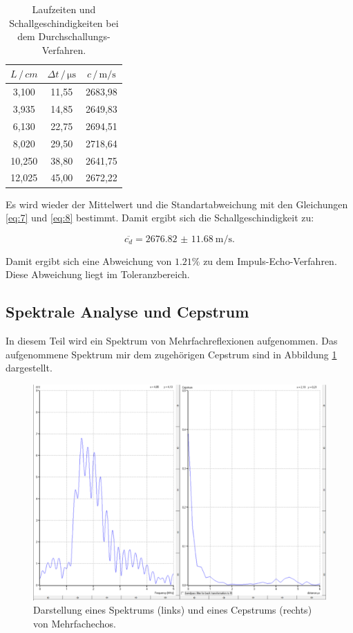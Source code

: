 \begin{table}[H]
  \centering
  \caption{Laufzeiten und Schallgeschindigkeiten bei dem Durchschallungs-Verfahren.}
  \label{tab:5}
  \begin{tabular}{c c c}
    \toprule
    $L \, / \, cm$ & $\Delta t \, / \, \si{\micro\second}$ & $c \, / \, \si{\meter\per\second}$ \\
    \midrule
     3,100 & 11,55 & 2683,98 \\
     3,935 & 14,85 & 2649,83 \\
     6,130 & 22,75 & 2694,51 \\
     8,020 & 29,50 & 2718,64 \\
    10,250 & 38,80 & 2641,75 \\
    12,025 & 45,00 & 2672,22 \\
    \bottomrule
  \end{tabular}
\end{table}

Es wird wieder der Mittelwert und die Standartabweichung mit den Gleichungen \ref{eq:7} und
\ref{eq:8} bestimmt. Damit ergibt sich die Schallgeschindigkeit zu:

\begin{equation*}
  \overline{c_d} = \SI{2676.82(1168)}{\meter\per\second}.
\end{equation*}

Damit ergibt sich eine Abweichung von $ 1.21 \% $ zu dem Impuls-Echo-Verfahren. Diese
Abweichung liegt im Toleranzbereich.

\subsection{Spektrale Analyse und Cepstrum}

In diesem Teil wird ein Spektrum von Mehrfachreflexionen aufgenommen. Das aufgenommene
Spektrum mir dem zugehörigen Cepstrum sind in Abbildung \ref{abb:3} dargestellt.

\begin{figure}[H]
  \centering
  \includegraphics[width=\textwidth]{content/FFT.png}
  \caption{Darstellung eines Spektrums (links) und eines Cepstrums (rechts) von Mehrfachechos.}
  \label{abb:3}
\end{figure}

